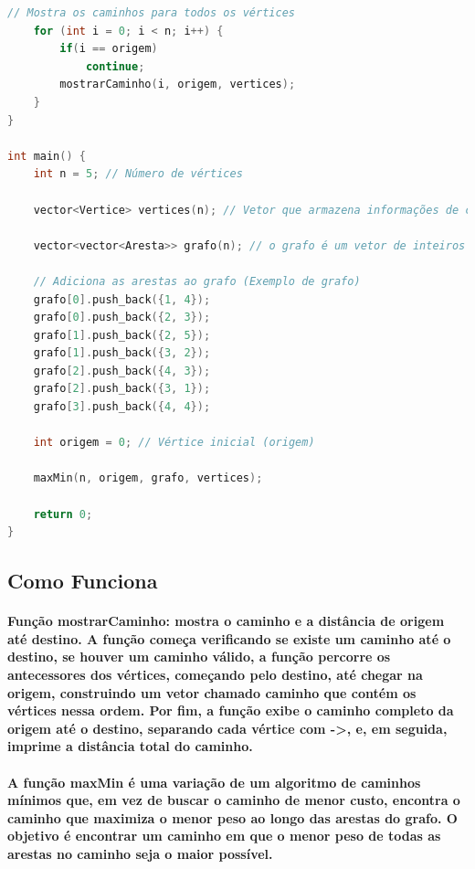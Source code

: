 \documentclass{article}
\begin{document}
\begin{lstlisting}[language=c++ ,caption = Exemplo C++]
    // Mostra os caminhos para todos os vértices
    for (int i = 0; i < n; i++) {
        if(i == origem)
            continue;
        mostrarCaminho(i, origem, vertices);
    }
}

int main() {
    int n = 5; // Número de vértices

    vector<Vertice> vertices(n); // Vetor que armazena informações de cada vértice

    vector<vector<Aresta>> grafo(n); // o grafo é um vetor de inteiros (vértices), onde cada vértice possui um vetor de arestas

    // Adiciona as arestas ao grafo (Exemplo de grafo)
    grafo[0].push_back({1, 4});
    grafo[0].push_back({2, 3});
    grafo[1].push_back({2, 5});
    grafo[1].push_back({3, 2});
    grafo[2].push_back({4, 3});
    grafo[2].push_back({3, 1});
    grafo[3].push_back({4, 4});

    int origem = 0; // Vértice inicial (origem)

    maxMin(n, origem, grafo, vertices);

    return 0;
}

\end{lstlisting}
\subsection{Como Funciona}

\paragraph{Função mostrarCaminho: mostra o caminho e a distância de origem até destino. A função começa verificando se existe um caminho até o destino, se houver um caminho válido, a função percorre os antecessores dos vértices, começando pelo destino, até chegar na origem, construindo um vetor chamado caminho que contém os vértices nessa ordem. Por fim, a função exibe o caminho completo da origem até o destino, separando cada vértice com ->, e, em seguida, imprime a distância total do caminho.}

\paragraph{A função maxMin é uma variação de um algoritmo de caminhos mínimos que, em vez de buscar o caminho de menor custo, encontra o caminho que maximiza o menor peso ao longo das arestas do grafo. O objetivo é encontrar um caminho em que o menor peso de todas as arestas no caminho seja o maior possível.}
\end{document}
